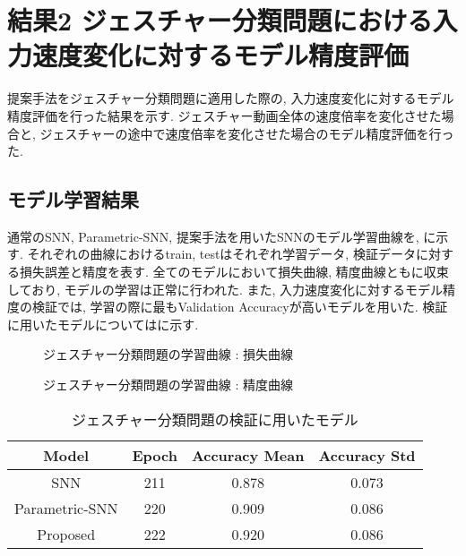 \section{結果2 ジェスチャー分類問題における入力速度変化に対するモデル精度評価} \label{sec:result2}
提案手法をジェスチャー分類問題に適用した際の, 入力速度変化に対するモデル精度評価を行った結果を示す.
ジェスチャー動画全体の速度倍率を変化させた場合と, ジェスチャーの途中で速度倍率を変化させた場合のモデル精度評価を行った.

\subsection{モデル学習結果}
通常のSNN, Parametric-SNN, 提案手法を用いたSNNのモデル学習曲線を, に示す.
それぞれの曲線におけるtrain, testはそれぞれ学習データ, 検証データに対する損失誤差と精度を表す.
全てのモデルにおいて損失曲線, 精度曲線ともに収束しており, モデルの学習は正常に行われた.
また, 入力速度変化に対するモデル精度の検証では, 学習の際に最もValidation Accuracyが高いモデルを用いた.
検証に用いたモデルについてはに示す.
\begin{figure}[htb]
    \centering
    
    \caption{ジェスチャー分類問題の学習曲線 : 損失曲線}
    \label{fig:result2:losscurve}
\end{figure}
\begin{figure}[htb]
    \centering
    
    \caption{ジェスチャー分類問題の学習曲線 : 精度曲線}
    \label{fig:result2:acccurve}
\end{figure}

\begin{table}[htb]
    \centering
    \caption{ジェスチャー分類問題の検証に用いたモデル}
    \label{tab:result2:model:parameter}
    \begin{tabular}{cccc}
        \hline
        \textbf{Model}& \textbf{Epoch} & \textbf{Accuracy Mean} & \textbf{Accuracy Std}\\
        \hline
        SNN &  211 & 0.878 & 0.073\\
        Parametric-SNN & 220 & 0.909 & 0.086\\
        Proposed & 222 & 0.920 & 0.086\\
        \hline
    \end{tabular}
\end{table}
\clearpage

